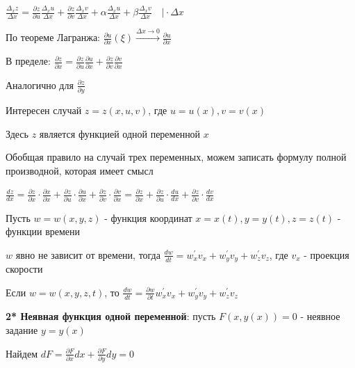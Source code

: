 \documentclass[12pt]{article}
\begin{document}
    $\displaystyle \frac{\Delta_x z}{\Delta x} = \frac{\partial z}{\partial u} \frac{\Delta_x u}{\Delta x} + \frac{\partial z}{\partial v} \frac{\Delta_x v}{\Delta x} + \alpha \frac{\Delta_x u}{\Delta x} + \beta \frac{\Delta_x v}{\Delta x} \quad \Big| \cdot \Delta x$

    По теореме Лагранжа: $\displaystyle \frac{\partial u}{\partial x}(\xi) \stackrel{\Delta x \to 0}{\rightarrow} \frac{\partial u}{\partial x}$

    В пределе: $\displaystyle \frac{\partial z}{\partial x} = \frac{\partial z}{\partial u} \frac{\partial u}{\partial x} + \frac{\partial z}{\partial v} \frac{\partial v}{\partial x}$

    Аналогично для $\displaystyle \frac{\partial z}{\partial y}$

    \Nota Интересен случай $\displaystyle z = z(x, u, v)$, где $\displaystyle u = u(x), v = v(x)$

    Здесь $\displaystyle z$ является функцией одной переменной $\displaystyle x$

    Обобщая правило на случай трех переменных, можем записать формулу полной производной, которая имеет смысл

    $\displaystyle \frac{dz}{dx} = \frac{\partial z}{\partial x} \cdot \frac{\partial x}{\partial x} +
    \frac{\partial z}{\partial u} \cdot \frac{\partial u}{\partial x} +
    \frac{\partial z}{\partial v} \cdot \frac{\partial v}{\partial x} =
    \frac{\partial z}{\partial x} +
    \frac{\partial z}{\partial u} \cdot \frac{du}{dx} +
    \frac{\partial z}{\partial v} \cdot \frac{dv}{dx}
    $\displaystyle 

    \Ex Пусть $\displaystyle w = w(x, y, z)$ - функция координат $\displaystyle x = x(t), y = y(t), z = z(t)$ - функции времени

    $\displaystyle w$ явно не зависит от времени, тогда $\displaystyle \frac{dw}{dt} = w^\prime_x v_x + w^\prime_y v_y + w^\prime_z v_z$, где $\displaystyle v_x$ - проекция скорости

    Если $\displaystyle w = w(x, y, z, t)$, то $\displaystyle \frac{dw}{dt} = \frac{\partial w}{\partial t} w^\prime_x v_x + w^\prime_y v_y + w^\prime_z v_z$
    
    \vspace{3mm}
    
    \textbf{2* Неявная функция одной переменной}: пусть $\displaystyle F(x, y(x)) = 0$ - неявное задание $\displaystyle y = y(x)$

    Найдем $\displaystyle dF = \frac{\partial F}{\partial x} dx + \frac{\partial F}{\partial y} dy = 0$
\end{document}

